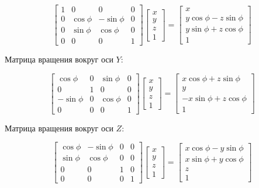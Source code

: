 \documentclass[a5paper, 10pt]{article}
\theoremstyle{definition}
\theoremstyle{plain}
\theoremstyle{remark}
\begin{document}
\begin{equation}
\begin{bmatrix}
1 & 0 & 0 & 0\\
0 & \cos \phi & - \sin \phi & 0 \\
0 & \sin \phi & \cos \phi & 0\\
0 & 0 & 0 & 1
\end{bmatrix}
\begin{bmatrix}
x\\
y\\
z\\
1
\end{bmatrix}
=
\begin{bmatrix}
x \\
y \cos \phi - z \sin \phi \\
y \sin \phi + z \cos \phi\\
1
\end{bmatrix}
\end{equation}

Матрица вращения вокруг оси $Y$:

\begin{equation}
\begin{bmatrix}
 \cos \phi & 0 & \sin \phi & 0\\
0 & 1 & 0 & 0 \\
- \sin \phi & 0 & \cos \phi & 0\\
0 & 0 & 0 & 1
\end{bmatrix}
\begin{bmatrix}
x\\
y\\
z\\
1
\end{bmatrix}
=
\begin{bmatrix}
x \cos \phi + z \sin \phi \\
y \\
-x \sin \phi + z \cos \phi\\
1
\end{bmatrix}
\end{equation}

Матрица вращения вокруг оси $Z$:

\begin{equation}
\begin{bmatrix}
 \cos \phi & - \sin \phi & 0 & 0\\
\sin \phi & \cos \phi & 0 & 0 \\
0 & 0 & 1 & 0\\
0 & 0 & 0 & 1
\end{bmatrix}
\begin{bmatrix}
x\\
y\\
z\\
1
\end{bmatrix}
=
\begin{bmatrix}
x \cos \phi - y \sin \phi \\
x \sin \phi + y \cos \phi \\
 z \\
1
\end{bmatrix}
\end{equation}
\end{document}
